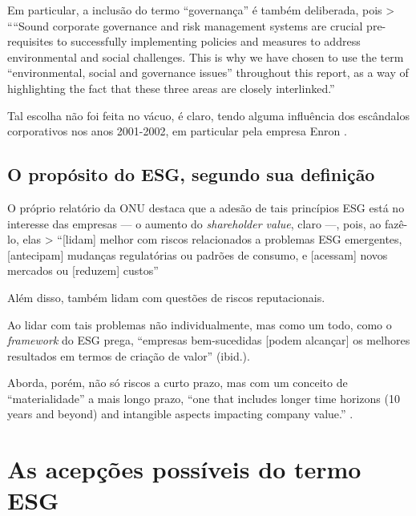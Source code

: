 \documentclass[12pt]{article}
\numberwithin{equation}{section}
\theoremstyle{plain}
\theoremstyle{definition}
\theoremstyle{remark}
\begin{document}
Em particular, a inclusão do termo ``governança'' é também deliberada, pois \textgreater{} ````Sound corporate governance and risk management systems are crucial pre-requisites to successfully implementing policies and measures to address environmental and social challenges. This is why we have chosen to use the term ``environmental, social and governance issues'' throughout this report, as a way of highlighting the fact that these three areas are closely interlinked.'' \parencite[, p. 2]{GlobalCompact2004}

Tal escolha não foi feita no vácuo, é claro, tendo alguma influência dos escândalos corporativos nos anos 2001-2002, em particular pela empresa Enron \parencite[, p. 14]{Pollman2022}.

\hypertarget{o-propuxf3sito-do-esg-segundo-sua-definiuxe7uxe3o}{%
\subsection{O propósito do ESG, segundo sua definição}\label{o-propuxf3sito-do-esg-segundo-sua-definiuxe7uxe3o}}

O próprio relatório da ONU destaca que a adesão de tais princípios ESG está no interesse das empresas --- o aumento do \textit{shareholder value}, claro ---, pois, ao fazê-lo, elas \textgreater{} ``{[}lidam{]} melhor com riscos relacionados a problemas ESG emergentes, {[}antecipam{]} mudanças regulatórias ou padrões de consumo, e {[}acessam{]} novos mercados ou {[}reduzem{]} custos'' \parencite[, p. 9]{GlobalCompact2004}

Além disso, também lidam com questões de riscos reputacionais.

Ao lidar com tais problemas não individualmente, mas como um todo, como o \textit{framework} do ESG prega, ``empresas bem-sucedidas {[}podem alcançar{]} os melhores resultados em termos de criação de valor'' (ibid.).

Aborda, porém, não só riscos a curto prazo, mas com um conceito de ``materialidade'' a mais longo prazo, ``one that includes longer time horizons (10 years and beyond) and intangible aspects impacting company value.'' \parencite[, p. 15]{GlobalCompact2004}.

\hypertarget{as-acepuxe7uxf5es-possuxedveis-do-termo-esg}{%
\section{As acepções possíveis do termo ESG}\label{as-acepuxe7uxf5es-possuxedveis-do-termo-esg}}
\end{document}
